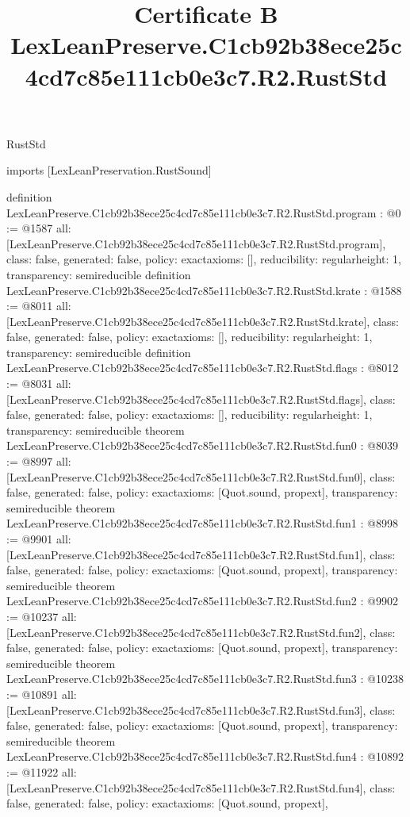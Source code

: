 \begin{lexlean}{RustStd}
\title{Certificate B LexLeanPreserve.C1cb92b38ece25c4cd7c85e111cb0e3c7.R2.RustStd}
\begin{coremodule}
imports [LexLeanPreservation.RustSound]

definition LexLeanPreserve.C1cb92b38ece25c4cd7c85e111cb0e3c7.R2.RustStd.program : @0 := @1587 {
  all: [LexLeanPreserve.C1cb92b38ece25c4cd7c85e111cb0e3c7.R2.RustStd.program],
  class: false,
  generated: false,
  policy: exact{axioms: []},
  reducibility: regular{height: 1},
  transparency: semireducible
}
definition LexLeanPreserve.C1cb92b38ece25c4cd7c85e111cb0e3c7.R2.RustStd.krate : @1588 := @8011 {
  all: [LexLeanPreserve.C1cb92b38ece25c4cd7c85e111cb0e3c7.R2.RustStd.krate],
  class: false,
  generated: false,
  policy: exact{axioms: []},
  reducibility: regular{height: 1},
  transparency: semireducible
}
definition LexLeanPreserve.C1cb92b38ece25c4cd7c85e111cb0e3c7.R2.RustStd.flags : @8012 := @8031 {
  all: [LexLeanPreserve.C1cb92b38ece25c4cd7c85e111cb0e3c7.R2.RustStd.flags],
  class: false,
  generated: false,
  policy: exact{axioms: []},
  reducibility: regular{height: 1},
  transparency: semireducible
}
theorem LexLeanPreserve.C1cb92b38ece25c4cd7c85e111cb0e3c7.R2.RustStd.fun0 : @8039 := @8997 {
  all: [LexLeanPreserve.C1cb92b38ece25c4cd7c85e111cb0e3c7.R2.RustStd.fun0],
  class: false,
  generated: false,
  policy: exact{axioms: [Quot.sound, propext]},
  transparency: semireducible
}
theorem LexLeanPreserve.C1cb92b38ece25c4cd7c85e111cb0e3c7.R2.RustStd.fun1 : @8998 := @9901 {
  all: [LexLeanPreserve.C1cb92b38ece25c4cd7c85e111cb0e3c7.R2.RustStd.fun1],
  class: false,
  generated: false,
  policy: exact{axioms: [Quot.sound, propext]},
  transparency: semireducible
}
theorem LexLeanPreserve.C1cb92b38ece25c4cd7c85e111cb0e3c7.R2.RustStd.fun2 : @9902 := @10237 {
  all: [LexLeanPreserve.C1cb92b38ece25c4cd7c85e111cb0e3c7.R2.RustStd.fun2],
  class: false,
  generated: false,
  policy: exact{axioms: [Quot.sound, propext]},
  transparency: semireducible
}
theorem LexLeanPreserve.C1cb92b38ece25c4cd7c85e111cb0e3c7.R2.RustStd.fun3 : @10238 := @10891 {
  all: [LexLeanPreserve.C1cb92b38ece25c4cd7c85e111cb0e3c7.R2.RustStd.fun3],
  class: false,
  generated: false,
  policy: exact{axioms: [Quot.sound, propext]},
  transparency: semireducible
}
theorem LexLeanPreserve.C1cb92b38ece25c4cd7c85e111cb0e3c7.R2.RustStd.fun4 : @10892 := @11922 {
  all: [LexLeanPreserve.C1cb92b38ece25c4cd7c85e111cb0e3c7.R2.RustStd.fun4],
  class: false,
  generated: false,
  policy: exact{axioms: [Quot.sound, propext]},
}
\end{coremodule}
\end{lexlean}
